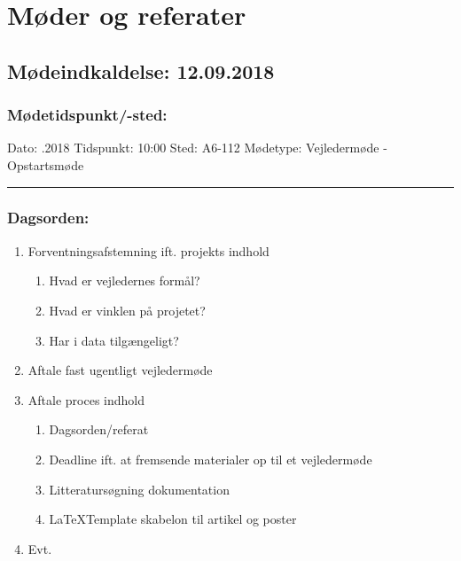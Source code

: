 \chapter{Møder og referater}
\section*{Mødeindkaldelse: 12.09.2018}

\subsection*{Mødetidspunkt/-sted:}

Dato: .2018
\newline
Tidspunkt: \tabto{9em} 10:00
\newline
Sted: \tabto{9em} A6-112
\newline
Mødetype: \tabto{9em} Vejledermøde - Opstartsmøde
\vspace{0.5cm}
\hrule
\subsection*{Dagsorden:}
\begin{enumerate}
    \item Forventningsafstemning ift. projekts indhold
    \begin{enumerate}
        \item Hvad er vejledernes formål?
        \item Hvad er vinklen på projetet?
        \item Har i data tilgængeligt?
    \end{enumerate}
    \item Aftale fast ugentligt vejledermøde
    \item Aftale proces indhold
    \begin{enumerate}
        \item Dagsorden/referat
        \item Deadline ift. at fremsende materialer op til et vejledermøde
        \item Litteratursøgning dokumentation
        \item \LaTeX Template skabelon til artikel og poster
    \end{enumerate}
    \item Evt.
\end{enumerate}


